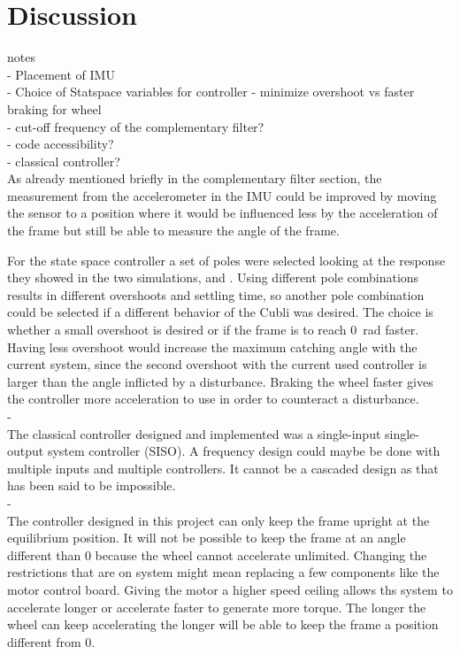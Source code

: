 \chapter{Discussion}

{\Large notes} \\
- Placement of IMU\\
- Choice of Statspace variables for controller - minimize overshoot vs faster braking for wheel\\
- cut-off frequency of the complementary filter?\\
- code accessibility?\\
- classical controller?\\


As already mentioned briefly in the complementary filter section, the measurement from the accelerometer in the IMU could be improved by moving the sensor to a position where it would be influenced less by the acceleration of the frame but still be able to measure the angle of the frame. 

For the state space controller a set of poles were selected looking at the response they showed in the two simulations,  and . Using different pole combinations results in different overshoots and settling time, so another pole combination could be selected if a different behavior of the Cubli was desired. 
The choice is whether a small overshoot is desired or if the frame is to reach \SI{0}{rad} faster. 
Having less overshoot would increase the maximum catching angle with the current system, since the second overshoot with the current used controller is larger than the angle inflicted by a disturbance. 
Braking the wheel faster gives the controller more acceleration to use in order to counteract a disturbance. 
\\-\\
The classical controller designed and implemented was a single-input single-output system controller (SISO). A frequency design could maybe be done with multiple inputs and multiple controllers. It cannot be a cascaded design as that has been said to be impossible. 
\\-\\
The controller designed in this project can only keep the frame upright at the equilibrium position. It will not be possible to keep the frame at an angle different than \si{0^\circ} because the wheel cannot accelerate unlimited. Changing the restrictions that are on system might mean replacing a few components like the motor control board. Giving the motor a higher speed ceiling allows ths system to accelerate longer or accelerate faster to generate more torque. The longer the wheel can keep accelerating the longer will be able to keep the frame a position different from \si{0^\circ}.
